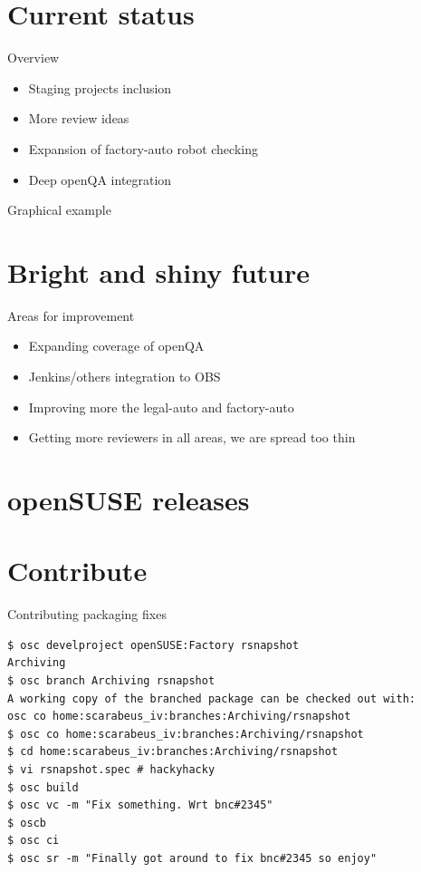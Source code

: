 \documentclass{beamer}
\begin{document}
\section{Current status}

\begin{frame}[t]{Overview}
	\begin{itemize}
	\item Staging projects inclusion
	\item More review ideas
	\item Expansion of factory-auto robot checking
	\item Deep openQA integration
	\end{itemize}
\end{frame}

\begin{frame}{Graphical example}
\end{frame}

\section{Bright and shiny future}

\begin{frame}[t]{Areas for improvement}
	\begin{itemize}
	\item Expanding coverage of openQA
	\item Jenkins/others integration to OBS
	\item Improving more the legal-auto and factory-auto
	\item Getting more reviewers in all areas, we are spread too thin
	\end{itemize}
\end{frame}


\section{openSUSE releases}

\section{Contribute}

\begin{frame}[fragile]{Contributing packaging fixes}
        \begin{tiny}
        \begin{verbatim}
$ osc develproject openSUSE:Factory rsnapshot
Archiving
$ osc branch Archiving rsnapshot
A working copy of the branched package can be checked out with:
osc co home:scarabeus_iv:branches:Archiving/rsnapshot
$ osc co home:scarabeus_iv:branches:Archiving/rsnapshot
$ cd home:scarabeus_iv:branches:Archiving/rsnapshot
$ vi rsnapshot.spec # hackyhacky
$ osc build
$ osc vc -m "Fix something. Wrt bnc#2345"
$ oscb
$ osc ci
$ osc sr -m "Finally got around to fix bnc#2345 so enjoy"
        \end{verbatim}
        \end{tiny}
\end{frame}
\end{document}

